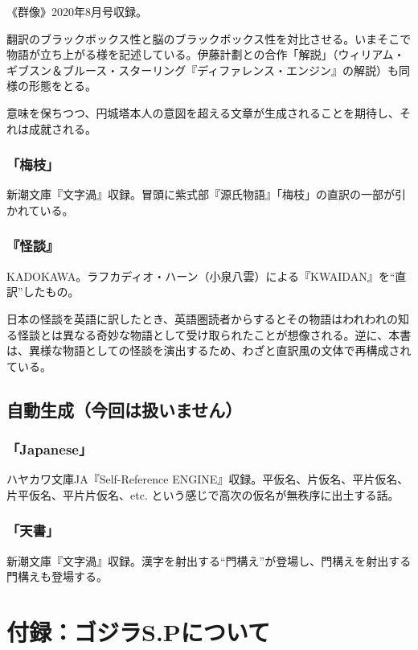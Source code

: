 \documentclass[10pt, a5paper, twoside]{jsarticle}
\theoremstyle{definition}
\begin{document}
				《群像》2020年8月号収録。

				翻訳のブラックボックス性と脳のブラックボックス性を対比させる。いまそこで物語が立ち上がる様を記述している。伊藤計劃との合作「解説」（ウィリアム・ギブスン＆ブルース・スターリング『ディファレンス・エンジン』の解説）も同様の形態をとる。

				意味を保ちつつ、円城塔本人の意図を超える文章が生成されることを期待し、それは成就される。

			\subsubsection{「梅枝」}

				新潮文庫『文字渦』収録。冒頭に紫式部『源氏物語』「梅枝」の直訳の一部が引かれている。

			\subsubsection{『怪談』}

				KADOKAWA。ラフカディオ・ハーン（小泉八雲）による『KWAIDAN』を“直訳”したもの。

				日本の怪談を英語に訳したとき、英語圏読者からするとその物語はわれわれの知る怪談とは異なる奇妙な物語として受け取られたことが想像される。逆に、本書は、異様な物語としての怪談を演出するため、わざと直訳風の文体で再構成されている。

		\subsection{自動生成（今回は扱いません）}

			\subsubsection{「Japanese」}

				ハヤカワ文庫JA『Self-Reference ENGINE』収録。平仮名、片仮名、平片仮名、片平仮名、平片片仮名、etc. という感じで高次の仮名が無秩序に出土する話。

			\subsubsection{「天書」}

				新潮文庫『文字渦』収録。漢字を射出する“門構え”が登場し、門構えを射出する門構えも登場する。

	\clearpage

	\section{付録：ゴジラS.Pについて}
\end{document}
